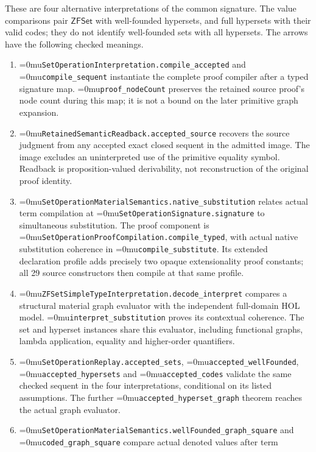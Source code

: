 \documentclass[11pt]{article}
\newcommand{\leanname}[1]{\textup{\Urlmuskip=0mu\relax\nolinkurl{#1}}}
\theoremstyle{definition}
\theoremstyle{remark}
\begin{document}
These are four alternative interpretations of the common signature. The
value comparisons pair $\mathsf{ZFSet}$ with well-founded hypersets, and full
hypersets with their valid codes; they do not identify well-founded sets with
all hypersets. The arrows have the following checked meanings.
\begin{enumerate}[leftmargin=*]
\item \leanname{SetOperationInterpretation.compile_accepted} and
  \leanname{compile_sequent} instantiate the complete proof compiler after a
  typed signature map. \leanname{proof_nodeCount} preserves the retained
  source proof's node count during this map; it is not a bound on the later
  primitive graph expansion.
\item \leanname{RetainedSemanticReadback.accepted_source} recovers the source
  judgment from any accepted exact closed sequent in the admitted image.
  The image excludes an uninterpreted use of the primitive equality symbol.
  Readback is proposition-valued derivability, not reconstruction of the
  original proof identity.
\item \leanname{SetOperationMaterialSemantics.native_substitution} relates
  actual term compilation at \leanname{SetOperationSignature.signature} to
  simultaneous substitution. The proof component is
  \leanname{SetOperationProofCompilation.compile_typed}, with actual native
  substitution coherence in \leanname{compile_substitute}. Its extended
  declaration profile adds precisely two opaque extensionality proof constants;
  all 29 source constructors then compile at that same profile.
\item \leanname{ZFSetSimpleTypeInterpretation.decode_interpret} compares a
  structural material graph evaluator with the independent full-domain HOL
  model. \leanname{interpret_substitution} proves its contextual coherence.
  The set and hyperset instances share this evaluator, including functional
  graphs, lambda application, equality and higher-order quantifiers.
\item \leanname{SetOperationReplay.accepted_sets},
  \leanname{accepted_wellFounded}, \leanname{accepted_hypersets} and
  \leanname{accepted_codes} validate the same checked sequent in the four
  interpretations, conditional on its listed assumptions. The further
  \leanname{accepted_hyperset_graph} theorem reaches the actual graph evaluator.
\item \leanname{SetOperationMaterialSemantics.wellFounded_graph_square} and
  \leanname{coded_graph_square} compare actual denoted values after term

\end{enumerate}
\end{document}
